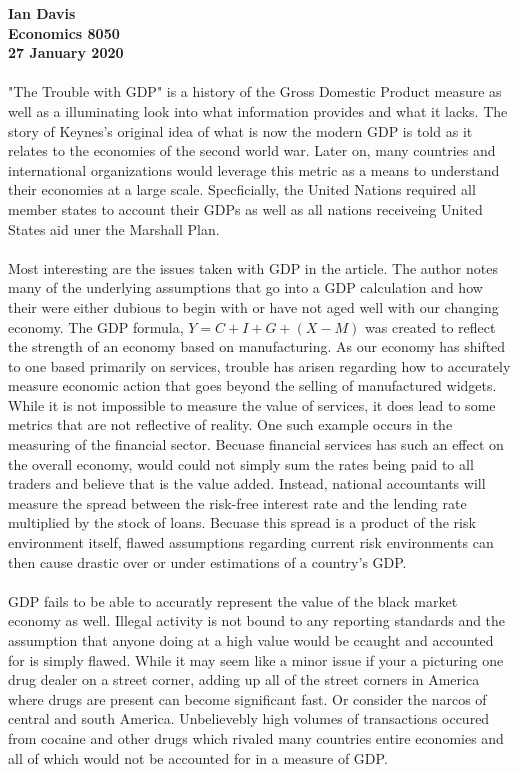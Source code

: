 
\let\counterwithout\relax
\let\counterwithin\relax
{}


\noindent \textbf{Ian Davis}\\
\noindent \textbf{Economics 8050}\\
\noindent \textbf{27 January 2020}\\
\\
"The Trouble with GDP" is a history of the Gross Domestic Product measure as well as a illuminating look into what information provides and what it lacks. The story of Keynes's original idea of what is now the modern GDP is told as it relates to the economies of the second world war. Later on, many countries and international organizations would leverage this metric as a means to understand their economies at a large scale. Specficially, the United Nations required all member states to account their GDPs as well as all nations receiveing United States aid uner the Marshall Plan.\\
\\
Most interesting are the issues taken with GDP in the article. The author notes many of the underlying assumptions that go into a GDP calculation and how their were either dubious to begin with or have not aged well with our changing economy. The GDP formula, $Y = C + I + G + (X - M)$ was created to reflect the strength of an economy based on manufacturing. As our economy has shifted to one based primarily on services, trouble has arisen regarding how to accurately measure economic action that goes beyond the selling of manufactured widgets. While it is not impossible to measure the value of services, it does lead to some metrics that are not reflective of reality. One such example occurs in the measuring of the financial sector. Becuase financial services has such an effect on the overall economy, would could not simply sum the rates being paid to all traders and believe that is the value added. Instead, national accountants will measure the spread between the risk-free interest rate and the lending rate multiplied by the stock of loans. Becuase this spread is a product of the risk environment itself, flawed assumptions regarding current risk environments can then cause drastic over or under estimations of a country's GDP.\\
\\
GDP fails to be able to accuratly represent the value of the black market economy as well. Illegal activity is not bound to any reporting standards and the assumption that anyone doing at a high value would be ccaught and accounted for is simply flawed. While it may seem like a minor issue if your a picturing one drug dealer on a street corner, adding up all of the street corners in America where drugs are present can become significant fast. Or consider the narcos of central and south America. Unbelievebly high volumes of transactions occured from cocaine and other drugs which rivaled many countries entire economies and all of which would not be accounted for in a measure of GDP.\\
